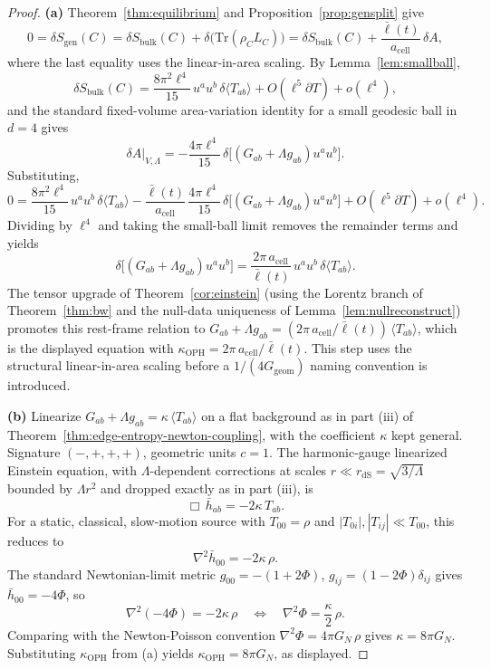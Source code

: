 \documentclass[11pt]{article}
\begin{document}
\begin{proof}
\textbf{(a)} Theorem~\ref{thm:equilibrium} and Proposition~\ref{prop:gensplit} give
\[
0=\delta S_{\mathrm{gen}}(C)=\delta S_{\mathrm{bulk}}(C)+\delta\!\bigl(\mathrm{Tr}(\rho_C L_C)\bigr)=\delta S_{\mathrm{bulk}}(C)+\frac{\bar\ell(t)}{a_{\mathrm{cell}}}\,\delta A,
\]
where the last equality uses the linear-in-area scaling. By Lemma~\ref{lem:smallball},
\[
\delta S_{\mathrm{bulk}}(C)=\frac{8\pi^2\ell^4}{15}\,u^au^b\,\delta\langle T_{ab}\rangle+O(\ell^5\partial T)+o(\ell^4),
\]
and the standard fixed-volume area-variation identity for a small geodesic ball in \(d=4\) gives
\[
\delta A\big|_{V,\Lambda}=-\frac{4\pi\ell^4}{15}\,\delta\!\bigl[(G_{ab}+\Lambda g_{ab})u^au^b\bigr].
\]
Substituting,
\[
0=\frac{8\pi^2\ell^4}{15}\,u^au^b\,\delta\langle T_{ab}\rangle-\frac{\bar\ell(t)}{a_{\mathrm{cell}}}\,\frac{4\pi\ell^4}{15}\,\delta\!\bigl[(G_{ab}+\Lambda g_{ab})u^au^b\bigr]+O(\ell^5\partial T)+o(\ell^4).
\]
Dividing by \(\ell^4\) and taking the small-ball limit removes the remainder terms and yields
\[
\delta\!\bigl[(G_{ab}+\Lambda g_{ab})u^au^b\bigr]=\frac{2\pi\,a_{\mathrm{cell}}}{\bar\ell(t)}\,u^au^b\,\delta\langle T_{ab}\rangle.
\]
The tensor upgrade of Theorem~\ref{cor:einstein} (using the Lorentz branch of Theorem~\ref{thm:bw} and the null-data uniqueness of Lemma~\ref{lem:nullreconstruct}) promotes this rest-frame relation to \(G_{ab}+\Lambda g_{ab}=(2\pi\,a_{\mathrm{cell}}/\bar\ell(t))\,\langle T_{ab}\rangle\), which is the displayed equation with \(\kappa_{\mathrm{OPH}}=2\pi\,a_{\mathrm{cell}}/\bar\ell(t)\). This step uses the structural linear-in-area scaling before a \(1/(4G_{\mathrm{geom}})\) naming convention is introduced.

\textbf{(b)} Linearize \(G_{ab}+\Lambda g_{ab}=\kappa\,\langle T_{ab}\rangle\) on a flat background as in part (iii) of Theorem~\ref{thm:edge-entropy-newton-coupling}, with the coefficient \(\kappa\) kept general. Signature \((-,+,+,+)\), geometric units \(c=1\). The harmonic-gauge linearized Einstein equation, with \(\Lambda\)-dependent corrections at scales \(r\ll r_{\mathrm{dS}}=\sqrt{3/\Lambda}\) bounded by \(\Lambda r^2\) and dropped exactly as in part (iii), is
\[
\Box\,\bar h_{ab}=-2\kappa\,T_{ab}.
\]
For a static, classical, slow-motion source with \(T_{00}=\rho\) and \(|T_{0i}|,|T_{ij}|\ll T_{00}\), this reduces to
\[
\nabla^2\bar h_{00}=-2\kappa\,\rho.
\]
The standard Newtonian-limit metric \(g_{00}=-(1+2\Phi)\), \(g_{ij}=(1-2\Phi)\delta_{ij}\) gives \(\bar h_{00}=-4\Phi\), so
\[
\nabla^2(-4\Phi)=-2\kappa\,\rho
\quad\Longleftrightarrow\quad
\nabla^2\Phi=\frac{\kappa}{2}\,\rho.
\]
Comparing with the Newton-Poisson convention \(\nabla^2\Phi=4\pi G_N\,\rho\) gives \(\kappa=8\pi G_N\). Substituting \(\kappa_{\mathrm{OPH}}\) from (a) yields \(\kappa_{\mathrm{OPH}}=8\pi G_N\), as displayed.


\end{proof}
\end{document}
